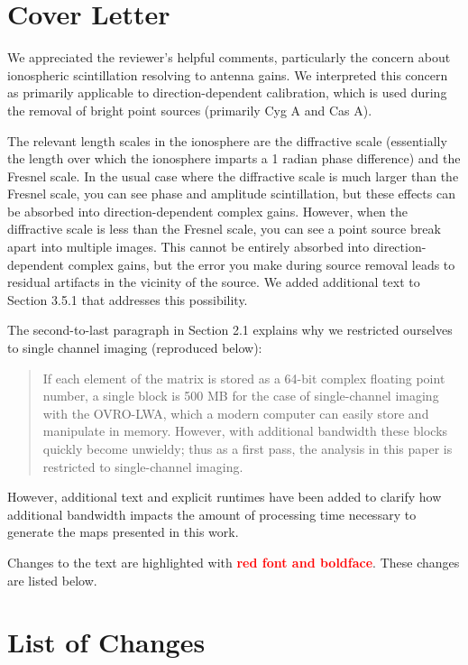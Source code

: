 \documentclass{article}
\newcommand{\revision}[1]{\textcolor{red}{\textbf{#1}}}
\begin{document}
\section{Cover Letter}

We appreciated the reviewer's helpful comments, particularly the concern about ionospheric
scintillation resolving to antenna gains.  We interpreted this concern as primarily applicable to
direction-dependent calibration, which is used during the removal of bright point sources (primarily
Cyg A and Cas A).

The relevant length scales in the ionosphere are the diffractive scale (essentially the length over
which the ionosphere imparts a 1 radian phase difference) and the Fresnel scale. In the usual case
where the diffractive scale is much larger than the Fresnel scale, you can see phase and amplitude
scintillation, but these effects can be absorbed into direction-dependent complex gains. However,
when the diffractive scale is less than the Fresnel scale, you can see a point source break apart
into multiple images. This cannot be entirely absorbed into direction-dependent complex gains, but
the error you make during source removal leads to residual artifacts in the vicinity of the source.
We added additional text to Section 3.5.1 that addresses this possibility.

The second-to-last paragraph in Section 2.1 explains why we restricted ourselves to single channel
imaging (reproduced below):

\begin{quote}
    If each element of the matrix is stored as a 64-bit complex floating point number, a single
    block is 500 MB for the case of single-channel imaging with the OVRO-LWA, which a modern
    computer can easily store and manipulate in memory.  However, with additional bandwidth these
    blocks quickly become unwieldy; thus as a first pass, the analysis in this paper is restricted
    to single-channel imaging.
\end{quote}

However, additional text and explicit runtimes have been added to clarify how additional bandwidth
impacts the amount of processing time necessary to generate the maps presented in this work.

Changes to the text are highlighted with \revision{red font and boldface}. These changes are listed
below.


\section{List of Changes}
\end{document}
